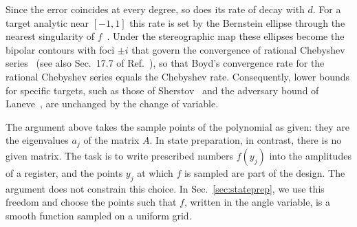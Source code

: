 Since the error coincides at every degree, so does its rate of
decay with $d$.  For a target analytic near $[-1,1]$ this rate is
set by the Bernstein ellipse through the nearest singularity of
$f$~\cite[Ch.~8]{Trefethen2013}.  Under the stereographic map
these ellipses become the bipolar contours with foci $\pm i$ that
govern the convergence of rational Chebyshev
series~\cite{Boyd1990} (see also Sec.~17.7 of
Ref.~\cite{Boyd2001}), so that Boyd's convergence rate for the
rational Chebyshev series equals the Chebyshev rate.
Consequently, lower bounds for specific targets, such as those of
Sherstov~\cite{Sherstov2013} and the adversary bound of
Laneve~\cite{Laneve2025}, are unchanged by the change of variable.

The argument above takes the sample
points of the polynomial as given: they are the eigenvalues $a_j$
of the matrix $A$.  In state preparation, in contrast, there is no
given matrix.  The task is to write prescribed numbers $f(y_j)$
into the amplitudes of a register, and the points $y_j$ at which
$f$ is sampled are part of the design.  The argument does not
constrain this choice.  In Sec.~\ref{sec:stateprep}, we use this
freedom and choose the points such that $f$, written in the angle
variable, is a smooth function sampled on a uniform grid.
